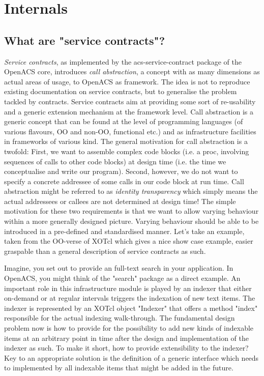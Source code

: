   \section{Internals}\label{sec:internal}
  \subsection{What are "service contracts"?}\label{sec:internal:contracts}
\emph{Service contracts}, as implemented by the acs-service-contract package of the OpenACS core, introduces \emph{call abstraction}, a concept with as many dimensions as actual areas of usage, to OpenACS as framework. The idea is not to reproduce existing documentation on service contracts, but to generalise the problem tackled by contracts. Service contracts aim at providing some sort of re-usability and a generic extension mechanism at the framework level. Call abstraction is a generic concept that can be found at the level of programming languages (of various flavours, OO and non-OO, functional etc.) and as infrastructure facilities in frameworks of various kind. The general motivation for call abstraction is a twofold: First, we want to assemble complex code blocks (i.e. a proc, involving sequences of calls to other code blocks) at design time (i.e. the time we conceptualise and write our program). Second, however, we do not want to specify a concrete addressee of some calls in our code block at run time. Call abstraction might be referred to as \emph{identity transparency} which simply means the actual addressees or callees are not determined at design time! The simple motivation for these two requirements is that we want to allow varying behaviour within a more generally designed picture. Varying behaviour should be able to be introduced in a pre-defined and standardised manner. Let's take an example, taken from the OO-verse of XOTcl which gives a nice show case example, easier graspable than a general description of service contracts as such. 
%
\lstset{breaklines=true,numbers=left,basicstyle=\footnotesize,frame=single}

%
Imagine, you set out to provide an full-text search in your application. In OpenACS, you might think of the "search" package as a direct example. An important role in this infrastructure module is played by an indexer that either on-demand or at regular intervals triggers the indexation of new text items. The indexer is represented by an XOTcl object  "Indexer" that offers a method "index" responsible for the actual indexing walk-through. The fundamental design problem now is how to provide for the possibility to add new kinds of indexable items at an arbitrary point in time after the design and implementation of the indexer as such. To make it short, how to provide extensibility to the indexer? Key to an appropriate solution is the definition of a generic interface which needs to implemented by all indexable items that might be added in the future. 
